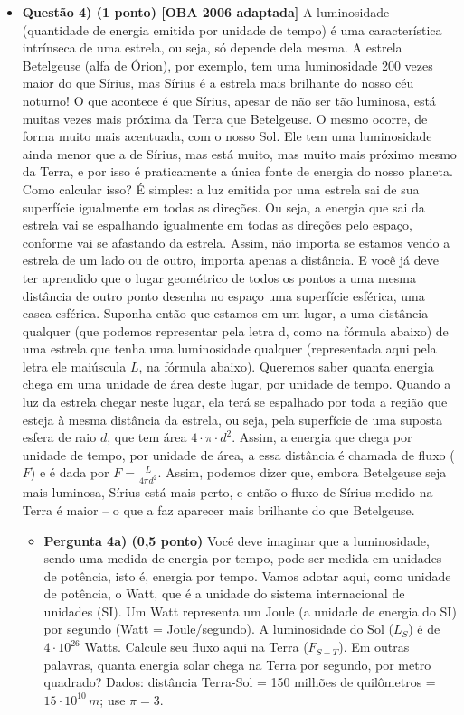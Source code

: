 \documentclass[a4paper, 12pt]{article}
\begin{document}
\begin{flushleft}
\begin{itemize}
            \item \textbf{Questão 4) (1 ponto) [OBA 2006 adaptada]} A luminosidade (quantidade de energia emitida por unidade de tempo) é uma característica intrínseca de uma estrela, ou seja, só depende dela mesma. A estrela Betelgeuse (alfa de Órion), por exemplo, tem uma luminosidade 200 vezes maior do que Sírius, mas Sírius é a estrela mais brilhante do nosso céu noturno! O que acontece é que Sírius, apesar de não ser tão luminosa, está muitas vezes mais próxima da Terra que Betelgeuse. O mesmo ocorre, de forma muito mais acentuada, com o nosso Sol. Ele tem uma luminosidade ainda menor que a de Sírius, mas está muito, mas muito mais próximo mesmo da Terra, e por isso é praticamente a única fonte de energia do nosso planeta. Como calcular isso? É simples: a luz emitida por uma estrela sai de sua superfície igualmente em todas as direções. Ou seja, a energia que sai da estrela vai se espalhando igualmente em todas as direções pelo espaço, conforme vai se afastando da estrela. Assim, não importa se estamos vendo a estrela de um lado ou de outro, importa apenas a distância. E você já deve ter aprendido que o lugar geométrico de todos os pontos a uma mesma distância de outro ponto desenha no espaço uma superfície esférica, uma casca esférica. Suponha então que estamos em um lugar, a uma distância qualquer (que podemos representar pela letra d, como na fórmula abaixo) de uma estrela que tenha uma luminosidade qualquer (representada aqui pela letra ele maiúscula $L$, na fórmula abaixo). Queremos saber quanta energia chega em uma unidade de área deste lugar, por unidade de tempo. Quando a luz da estrela chegar neste lugar, ela terá se espalhado por toda a região que esteja à mesma distância da estrela, ou seja, pela superfície de uma suposta esfera de raio $d$, que tem área $4 \cdot \pi \cdot d^2$. Assim, a energia que chega por unidade de tempo, por unidade de área, a essa distância é chamada de fluxo ($F$) e é dada por $F = \frac{L}{4 \pi d^2}$. Assim, podemos dizer que, embora Betelgeuse seja mais luminosa, Sírius está mais perto, e então o fluxo de Sírius medido na Terra é maior -- o que a faz aparecer mais brilhante do que Betelgeuse.
                \begin{itemize}
                    \item \textbf{Pergunta 4a) (0,5 ponto)} Você deve imaginar que a luminosidade, sendo uma medida de energia por tempo, pode ser medida em unidades de potência, isto é, energia por tempo. Vamos adotar aqui, como unidade de potência, o Watt, que é a unidade do sistema internacional de unidades (SI). Um Watt representa um Joule (a unidade de energia do SI) por segundo (Watt = Joule/segundo). A luminosidade do Sol ($L_S$) é de $4 \cdot 10^{26}$ Watts. Calcule seu fluxo aqui na Terra ($F_{S-T}$). Em outras palavras, quanta energia solar chega na Terra por segundo, por metro quadrado? Dados: distância Terra-Sol = 150 milhões de quilômetros = $15 \cdot 10^{10} \, m$; use $\pi = 3$.

\end{itemize}
\end{itemize}
\end{flushleft}
\end{document}
